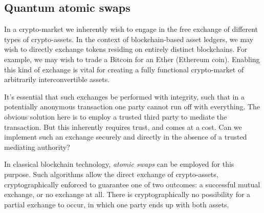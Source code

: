 
\subsection{Quantum atomic swaps}\label{sec:quantum_atomic_swaps}

In a crypto-market we inherently wish to engage in the free exchange of different types of crypto-assets. In the context of blockchain-based asset ledgers, we may wish to directly exchange tokens residing on entirely distinct blockchains. For example, we may wish to trade a Bitcoin for an Ether (Ethereum coin). Enabling this kind of exchange is vital for creating a fully functional crypto-market of arbitrarily interconvertible assets.

It's essential that such exchanges be performed with integrity, such that in a potentially anonymous transaction one party cannot run off with everything. The obvious solution here is to employ a trusted third party to mediate the transaction. But this inherently requires trust, and comes at a cost. Can we implement such an exchange securely and directly in the absence of a trusted mediating authority?

In classical blockchain technology, \textit{atomic swaps} can be employed for this purpose. Such algorithms allow the direct exchange of crypto-assets, cryptographically enforced to guarantee one of two outcomes: a successful mutual exchange, or no exchange at all. There is cryptographically no possibility for a partial exchange to occur, in which one party ends up with both assets.

